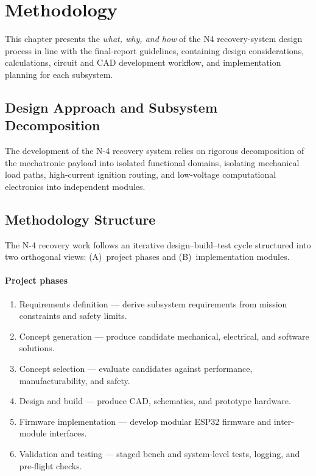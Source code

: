 \section{Methodology}
\label{sec:methodology}

This chapter presents the \textit{what, why, and how} of the N4 recovery-system design
process in line with the final-report guidelines, containing design considerations,
calculations, circuit and CAD development workflow, and implementation planning
for each subsystem.

\subsection{Design Approach and Subsystem Decomposition}
The development of the N-4 recovery system relies on rigorous decomposition of
the mechatronic payload into isolated functional domains, isolating mechanical
load paths, high-current ignition routing, and low-voltage computational
electronics into independent modules.

\subsection{Methodology Structure}

The N-4 recovery work follows an iterative design--build--test cycle structured
into two orthogonal views: (A)~project phases and (B)~implementation modules.

\paragraph{Project phases}
\begin{enumerate}[leftmargin=*]
  \item Requirements definition --- derive subsystem requirements from mission
    constraints and safety limits.
  \item Concept generation --- produce candidate mechanical, electrical, and
    software solutions.
  \item Concept selection --- evaluate candidates against performance,
    manufacturability, and safety.
  \item Design and build --- produce CAD, schematics, and prototype hardware.
  \item Firmware implementation --- develop modular ESP32 firmware and
    inter-module interfaces.
  \item Validation and testing --- staged bench and system-level tests, logging,
    and pre-flight checks.
\end{enumerate}

